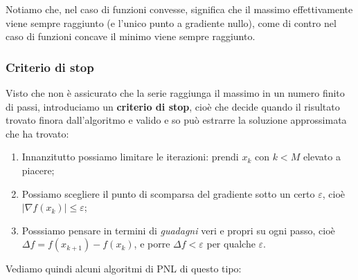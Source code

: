 \documentclass[a4paper,11pt]{article}
\begin{document}
Notiamo che, nel caso di funzioni convesse, significa che il massimo effettivamente viene sempre raggiunto (e l'unico punto a gradiente nullo), come di contro nel caso di funzioni concave il minimo viene sempre raggiunto.

\subsubsection{Criterio di stop}
Visto che non è assicurato che la serie raggiunga il massimo in un numero finito di passi, introduciamo un \textbf{criterio di stop}, cioè che decide quando il risultato trovato finora dall'algoritmo e valido e so può estrarre la soluzione approssimata che ha trovato:
\begin{enumerate}
	\item Innanzitutto possiamo limitare le iterazioni: prendi $x_k$ con $k < M$ elevato a piacere; \\ 
	\item Possiamo scegliere il punto di scomparsa del gradiente sotto un certo $\varepsilon$, cioè $|\nabla f(x_k)| \leq \varepsilon$;
	\item Posssiamo pensare in termini di \textit{guadagni} veri e propri su ogni passo, cioè $\Delta f = f(x_{k+1}) - f(x_k)$, e porre $\Delta f < \varepsilon$ per qualche $\varepsilon$.
\end{enumerate}

\par\medskip

Vediamo quindi alcuni algoritmi di PNL di questo tipo:
\end{document}
